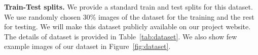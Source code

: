 \noindent\textbf{Train-Test splits.}
We provide a standard train and test splits for this dataset. We use randomly chosen 30\% images of the dataset for the training and the rest for testing. We will make this dataset publicly available on our project website. The details of dataset is provided in Table~\ref{tab:dataset}. We also show few example images of our dataset in Figure~\ref{fig:dataset}. 





 
%
%
%

